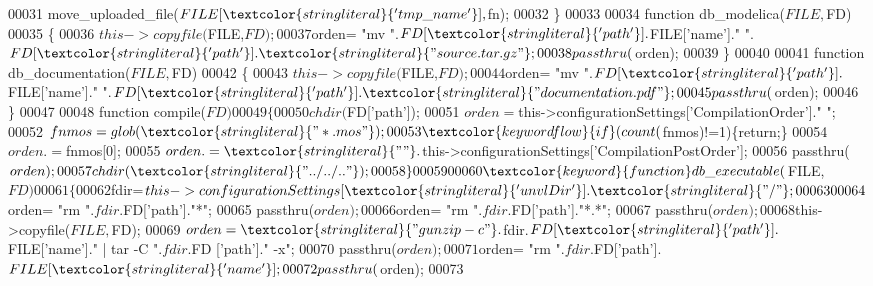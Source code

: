 \begin{DoxyCode}
00031     move\_uploaded\_file($FILE[\textcolor{stringliteral}{'tmp\_name'}],$fn);
00032   \}
00033   
00034   \textcolor{keyword}{function} db\_modelica($FILE,$FD)
00035   \{
00036     $this->copyfile($FILE,$FD);
00037     $orden= \textcolor{stringliteral}{"mv "}.$FD[\textcolor{stringliteral}{'path'}].$FILE[\textcolor{stringliteral}{'name'}].\textcolor{stringliteral}{" "}.$FD[\textcolor{stringliteral}{'path'}].\textcolor{stringliteral}{"source.tar.gz"};
00038     passthru($orden);
00039   \}
00040   
00041   \textcolor{keyword}{function} db\_documentation($FILE,$FD)
00042   \{
00043     $this->copyfile($FILE,$FD);
00044     $orden= \textcolor{stringliteral}{"mv "}.$FD[\textcolor{stringliteral}{'path'}].$FILE[\textcolor{stringliteral}{'name'}].\textcolor{stringliteral}{" "}.$FD[\textcolor{stringliteral}{'path'}].\textcolor{stringliteral}{"documentation.pdf"}
      ;
00045     passthru($orden);
00046   \}
00047   
00048   \textcolor{keyword}{function} compile($FD)
00049   \{
00050     chdir($FD[\textcolor{stringliteral}{'path'}]);
00051     $orden=$this->configurationSettings[\textcolor{stringliteral}{'CompilationOrder'}].\textcolor{stringliteral}{" "};
00052     $fnmos=glob(\textcolor{stringliteral}{"*.mos"});
00053     \textcolor{keywordflow}{if}(count($fnmos)!=1)\{\textcolor{keywordflow}{return};\}
00054     $orden.=$fnmos[0];
00055     $orden.=\textcolor{stringliteral}{" "}.$this->configurationSettings[\textcolor{stringliteral}{'CompilationPostOrder'}];
00056     passthru($orden);
00057     chdir(\textcolor{stringliteral}{"../../.."});
00058   \}
00059   
00060   \textcolor{keyword}{function} db\_executable($FILE,$FD)
00061   \{
00062     $fdir=$this->configurationSettings[\textcolor{stringliteral}{'unvlDir'}].\textcolor{stringliteral}{"/"};
00063 
00064     $orden= \textcolor{stringliteral}{"rm "}.$fdir.$FD[\textcolor{stringliteral}{'path'}].\textcolor{stringliteral}{"*"};
00065     passthru($orden);
00066     $orden= \textcolor{stringliteral}{"rm "}.$fdir.$FD[\textcolor{stringliteral}{'path'}].\textcolor{stringliteral}{"*.*"};
00067     passthru($orden);
00068     $this->copyfile($FILE,$FD);
00069     $orden= \textcolor{stringliteral}{"gunzip -c "}.$fdir.$FD[\textcolor{stringliteral}{'path'}].$FILE[\textcolor{stringliteral}{'name'}].\textcolor{stringliteral}{" | tar -C "}.$fdir.$FD
      [\textcolor{stringliteral}{'path'}].\textcolor{stringliteral}{" -x"};
00070     passthru($orden);
00071     $orden= \textcolor{stringliteral}{"rm "}.$fdir.$FD[\textcolor{stringliteral}{'path'}].$FILE[\textcolor{stringliteral}{'name'}];
00072     passthru($orden);
00073 

\end{DoxyCode}
